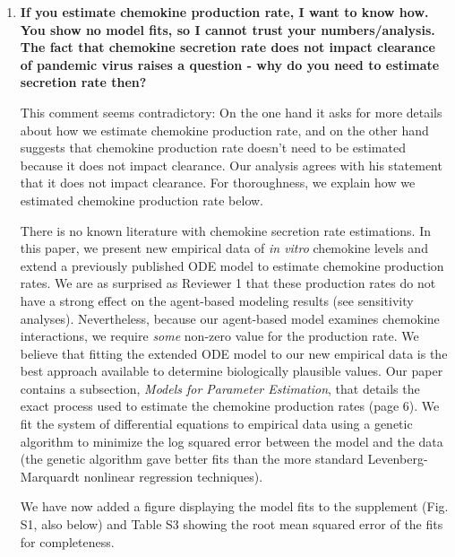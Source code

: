 \documentclass[10pt]{article}
\newenvironment{response}{\fontfamily{cmr}}{\par}
\begin{document}
\begin{enumerate}

\item \textbf{If you estimate chemokine production rate, I want to know how. You show no 
model fits, so I cannot trust your numbers/analysis. The fact that chemokine 
secretion rate does not impact clearance of pandemic virus raises a question -
why do you need to estimate secretion rate then?}

\begin{response}

This comment seems contradictory: On the one hand it asks for more
details about how we estimate chemokine production rate, and on the
other hand suggests that chemokine production rate doesn't need to
be estimated because it does not impact clearance.  Our analysis
agrees with his statement that it does not impact clearance. For
thoroughness, we explain how we estimated chemokine production rate
below.

There is no known literature with chemokine secretion rate
estimations.  In this paper, we present new empirical data of
\textit{in vitro} chemokine levels and extend a previously published
ODE model to estimate chemokine production rates.  We are as surprised
as Reviewer 1 that these production rates do not have a strong effect
on the agent-based modeling results (see sensitivity analyses).
Nevertheless, because our agent-based model examines chemokine
interactions, we require \textit{some} non-zero value for the production
rate.  We believe that fitting the extended ODE model to our new
empirical data is the best approach available to determine
biologically plausible values.  Our paper contains a subsection,
\textit{Models for Parameter Estimation}, that details the exact
process used to estimate the chemokine production rates (page 6).  We
fit the system of differential equations to empirical data using a
genetic algorithm to minimize the log squared error between the model
and the data (the genetic algorithm gave better fits than the more standard Levenberg-Marquardt nonlinear regression techniques).  

We have now added a figure displaying the model fits to the supplement (Fig. S1, also below) and Table S3 showing the root mean squared error of the fits for completeness.


%


\end{response}
\end{enumerate}
\end{document}
